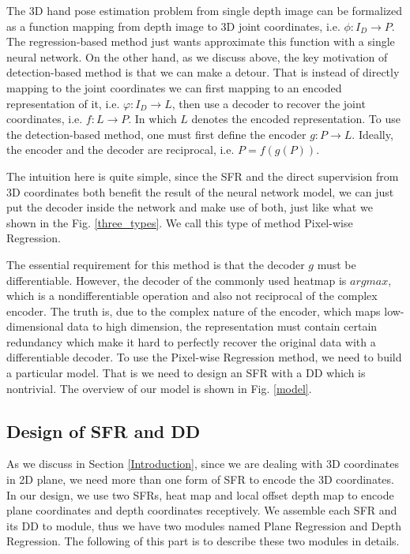 \documentclass[journal]{IEEEtran}
\begin{document}
The 3D hand pose estimation problem from single depth image can be formalized as a function mapping from depth image to 3D joint coordinates, i.e. $\phi : I_{D} \rightarrow P$. 
The regression-based method just wants approximate this function with a single neural network. 
On the other hand, as we discuss above, the key motivation of detection-based method is that we can make a detour. 
That is instead of directly mapping to the joint coordinates we can first mapping to an encoded representation of it, i.e. $\varphi : I_{D} \rightarrow L$, 
then use a decoder to recover the joint coordinates, i.e. $f : L \rightarrow P$. 
In which $L$ denotes the encoded representation. 
To use the detection-based method, one must first define the encoder $g : P \rightarrow L$. 
Ideally, the encoder and the decoder are reciprocal, i.e. $P=f(g(P))$. 

The intuition here is quite simple, 
since the SFR and the direct supervision from 3D coordinates both benefit the result of the neural network model, 
we can just put the decoder inside the network and make use of both, just like what we shown in the Fig\@. \ref{three_types}. 
We call this type of method Pixel-wise Regression.

The essential requirement for this method is that the decoder $g$ must be differentiable. 
However, the decoder of the commonly used heatmap is $argmax$, 
which is a nondifferentiable operation and also not reciprocal of the complex encoder. 
The truth is, due to the complex nature of the encoder, which maps low-dimensional data to high dimension, 
the representation must contain certain redundancy which make it hard to perfectly recover the original data with a differentiable decoder. 
To use the Pixel-wise Regression method, we need to build a particular model. 
That is we need to design an SFR with a DD which is nontrivial. 
The overview of our model is shown in Fig\@. \ref{model}. 

\subsection{Design of SFR and DD}

As we discuss in Section \ref{Introduction}, since we are dealing with 3D coordinates in 2D plane, 
we need more than one form of SFR to encode the 3D coordinates. 
In our design, we use two SFRs, heat map and local offset depth map to encode plane coordinates and depth coordinates receptively. 
We assemble each SFR and its DD to module, thus we have two modules named Plane Regression and Depth Regression. 
The following of this part is to describe these two modules in details. 
\end{document}

